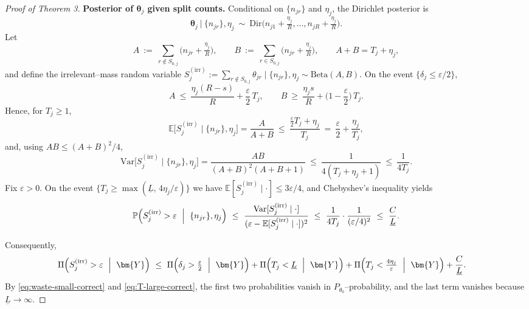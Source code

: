 \documentclass[11pt]{article}
\theoremstyle{plain}
\theoremstyle{definition}
\theoremstyle{plain}
\begin{document}
\begin{proof}[Proof of Theorem 3]
\medskip\noindent
\textbf{Posterior of $\boldsymbol\theta_j$ given split counts.}
Conditional on $\{n_{jr}\}$ and $\eta_j$, the Dirichlet posterior is
\[
\boldsymbol\theta_j\ \big|\ \{n_{jr}\},\eta_j\ \sim\
\mathrm{Dir}\Big(n_{j1}+\tfrac{\eta_j}{R},\dots,n_{jR}+\tfrac{\eta_j}{R}\Big).
\]
Let
\[
A\ :=\ \sum_{r\notin S_{0,j}}\Big(n_{jr}+\tfrac{\eta_j}{R}\Big),
\qquad
B\ :=\ \sum_{r\in S_{0,j}}\Big(n_{jr}+\tfrac{\eta_j}{R}\Big),
\qquad A+B=T_j+\eta_j,
\]
and define the irrelevant–mass random variable
\(
S_j^{\mathrm{(irr)}}:=\sum_{r\notin S_{0,j}}\theta_{jr}\mid \{n_{jr}\},\eta_j \sim \mathrm{Beta}(A,B).
\)
On the event $\{\delta_j\le \varepsilon/2\}$,
\[
A \ \le\ \frac{\eta_j(R-s)}{R}+\frac{\varepsilon}{2}\,T_j,
\qquad
B \ \ge\ \frac{\eta_j s}{R}+\Big(1-\frac{\varepsilon}{2}\Big)\,T_j.
\]
Hence, for $T_j\ge 1$,
\[
\mathbb E\big[S_j^{\mathrm{(irr)}}\mid \{n_{jr}\},\eta_j\big]
=\frac{A}{A+B}
\ \le\ \frac{\tfrac{\varepsilon}{2}T_j+\eta_j}{T_j}
\ =\ \frac{\varepsilon}{2}+\frac{\eta_j}{T_j},
\]
and, using $AB\le (A+B)^2/4$,
\[
\mathrm{Var}\big[S_j^{\mathrm{(irr)}}\mid \{n_{jr}\},\eta_j\big]
=\frac{AB}{(A+B)^2(A+B+1)}
\ \le\ \frac{1}{4(T_j+\eta_j+1)}
\ \le\ \frac{1}{4T_j}.
\]
Fix $\varepsilon>0$. On the event $\{T_j\ge \max(\underline L,\,4\eta_j/\varepsilon)\}$ we have
$\mathbb E[S_j^{\mathrm{(irr)}}\mid \cdot]\le 3\varepsilon/4$, and Chebyshev’s inequality yields
\begin{equation}\label{eq:beta-tail-correct}
\mathbb P \Big(S_j^{\mathrm{(irr)}}>\varepsilon\ \Bigm|\ \{n_{jr}\},\eta_j\Big)
\ \le\ \frac{\mathrm{Var}[S_j^{\mathrm{(irr)}}\mid\cdot]}{(\varepsilon-\mathbb E[S_j^{\mathrm{(irr)}}\mid\cdot])^2}
\ \le\ \frac{1}{4T_j}\cdot\frac{1}{(\varepsilon/4)^2}
\ \le\ \frac{C}{\underline L}.
\end{equation}

Consequently,
\begin{align*}
\Pi\Big(S_j^{\mathrm{(irr)}}>\varepsilon\ \Bigm|\ \bm{Y}\Big)
\ &\le\
\Pi\Big(\delta_j>\tfrac{\varepsilon}{2}\ \Bigm|\ \bm{Y}\Big)
+\Pi\Big(T_j<\underline L\ \Bigm|\ \bm{Y}\Big)
+\Pi\Big(T_j<\tfrac{4\eta_j}{\varepsilon}\ \Bigm|\ \bm{Y}\Big)
+\frac{C}{\underline L}.
\end{align*}
By \eqref{eq:waste-small-correct} and \eqref{eq:T-large-correct}, the first two probabilities vanish in $P_{\theta_0}$–probability,
and the last term vanishes because $\underline L\to\infty$.


\end{proof}
\end{document}
